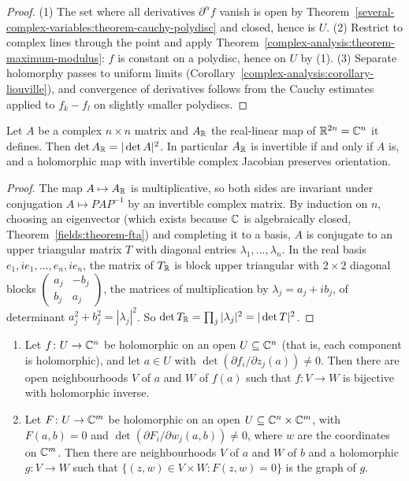 \begin{proof}
(1) The set where all derivatives $\partial^\alpha f$ vanish is open by Theorem~\ref{several-complex-variables:theorem-cauchy-polydisc} and closed, hence is $U$. (2) Restrict to complex lines through the
point and apply Theorem~\ref{complex-analysis:theorem-maximum-modulus}: $f$ is constant on a polydisc, hence on $U$ by (1). (3) Separate holomorphy passes to uniform limits
(Corollary~\ref{complex-analysis:corollary-liouville}), and convergence of derivatives follows from the Cauchy estimates applied to $f_k - f_l$ on slightly smaller polydiscs.
\end{proof}

\begin{lemma}\label{several-complex-variables:lemma-real-determinant}
Let $A$ be a complex $n \times n$ matrix and $A_{\mathbb{R}}$ the real-linear map of $\mathbb{R}^{2n} = \mathbb{C}^n$ it defines. Then $\det A_{\mathbb{R}} = |\det A|^2$. In particular $A_{\mathbb{R}}$ is invertible if and only if $A$ is, and a
holomorphic map with invertible complex Jacobian preserves orientation.
\end{lemma}

\begin{proof}
The map $A \mapsto A_{\mathbb{R}}$ is multiplicative, so both sides are invariant under conjugation $A \mapsto PAP^{-1}$ by an invertible complex matrix. By induction on $n$, choosing an eigenvector (which exists because
$\mathbb{C}$ is algebraically closed, Theorem~\ref{fields:theorem-fta}) and completing it to a basis, $A$ is conjugate to an upper triangular matrix $T$ with diagonal entries $\lambda_1, \ldots, \lambda_n$. In
the real basis $e_1, ie_1, \ldots, e_n, ie_n$, the matrix of $T_{\mathbb{R}}$ is block upper triangular with $2 \times 2$ diagonal blocks $\begin{pmatrix}a_j & -b_j\\ b_j & a_j\end{pmatrix}$, the matrices of multiplication by
$\lambda_j = a_j + ib_j$, of determinant $a_j^2 + b_j^2 = |\lambda_j|^2$. So $\det T_{\mathbb{R}} = \prod_j|\lambda_j|^2 = |\det T|^2$.
\end{proof}

\begin{proposition}\label{several-complex-variables:proposition-inverse-function}
\begin{enumerate}
\item Let $f \colon U \to \mathbb{C}^n$ be holomorphic on an open $U \subseteq \mathbb{C}^n$ (that is, each component is holomorphic), and let $a \in U$ with $\det(\partial f_i/\partial z_j(a)) \neq 0$. Then there are open
neighbourhoods $V$ of $a$ and $W$ of $f(a)$ such that $f \colon V \to W$ is bijective with holomorphic inverse.
\item Let $F \colon U \to \mathbb{C}^m$ be holomorphic on an open $U \subseteq \mathbb{C}^n \times \mathbb{C}^m$, with $F(a, b) = 0$ and $\det(\partial F_i/\partial w_j(a, b)) \neq 0$, where $w$ are the coordinates on $\mathbb{C}^m$. Then there are
neighbourhoods $V$ of $a$ and $W$ of $b$ and a holomorphic $g \colon V \to W$ such that $\{(z, w) \in V \times W : F(z, w) = 0\}$ is the graph of $g$.
\end{enumerate}
\end{proposition}

